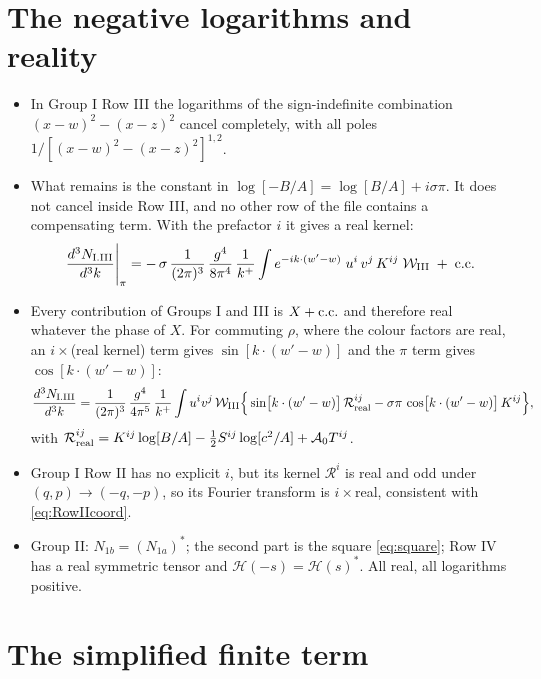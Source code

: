 \documentclass[10pt]{article}
\numberwithin{equation}{section}
\begin{document}
\section{The negative logarithms and reality}

\begin{itemize}
\item In Group I Row III the logarithms of the sign-indefinite combination $(x-w)^{2}-(x-z)^{2}$ cancel completely, with all poles $1/[(x-w)^{2}-(x-z)^{2}]^{1,2}$.
\item What remains is the constant in $\log[-B/A]=\log[B/A]+i\sigma\pi$. It does not cancel inside Row III, and no other row of the file contains a compensating term. With the prefactor $i$ it gives a real kernel:
\begin{align}
\frac{d^{3}N_{\rm I.III}}{d^{3}k}\Bigg|_{\pi}=-\,\sigma\,\frac{1}{(2\pi)^{3}}\,\frac{g^{4}}{8\pi^{4}}\,\frac{1}{k^{+}}\int e^{-ik\cdot(w'-w)}\;u^{i}\,v^{j}\,K^{ij}\;\mathcal{W}_{\rm III}\;+\;{\rm c.c.} \label{eq:piterm}
\end{align}
\item Every contribution of Groups I and III is $X+{\rm c.c.}$ and therefore real whatever the phase of $X$. For commuting $\rho$, where the colour factors are real, an $i\times$(real kernel) term gives $\sin[k\cdot(w'-w)]$ and the $\pi$ term gives $\cos[k\cdot(w'-w)]$:
\begin{align}
\frac{d^{3}N_{\rm I.III}}{d^{3}k}=\frac{1}{(2\pi)^{3}}\,\frac{g^{4}}{4\pi^{5}}\,\frac{1}{k^{+}}\int u^{i}v^{j}\,\mathcal{W}_{\rm III}
\Big\{\sin\!\big[k\cdot(w'-w)\big]\,\mathcal{R}^{ij}_{\rm real}-\sigma\pi\,\cos\!\big[k\cdot(w'-w)\big]\,K^{ij}\Big\},
\end{align}
with $\mathcal{R}^{ij}_{\rm real}=K^{ij}\log[B/A]-\tfrac12S^{ij}\log[c^{2}/A]+\mathcal{A}_{0}T^{ij}$.
\item Group I Row II has no explicit $i$, but its kernel $\mathcal{R}^{i}$ is real and odd under $(q,p)\to(-q,-p)$, so its Fourier transform is $i\times$real, consistent with \eqref{eq:RowIIcoord}.
\item Group II: $N_{1b}=(N_{1a})^{*}$; the second part is the square \eqref{eq:square}; Row IV has a real symmetric tensor and $\mathcal{H}(-s)=\mathcal{H}(s)^{*}$. All real, all logarithms positive.
\end{itemize}

\section{The simplified finite term}\label{sec:final}
\end{document}
